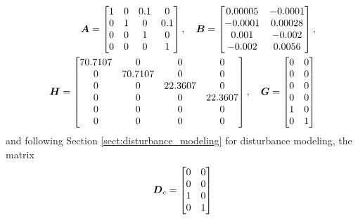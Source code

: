 \begin{equation*}
\begin{aligned}
    \vb*{A} = \begin{bmatrix}
        1 & 0 & 0.1 & 0\\
        0 & 1 & 0 & 0.1\\
        0 & 0 & 1 & 0\\
        0 & 0 & 0 & 1\\
    \end{bmatrix},\hspace{10pt}
    \vb*{B} = \begin{bmatrix}
	0.00005 & -0.0001\\
	-0.0001 & 0.00028\\
	0.001 & -0.002\\
	-0.002 & 0.0056\\
    \end{bmatrix},\\%
    \vb*{H} = \begin{bmatrix}
        70.7107 & 0 & 0 & 0\\
        0 & 70.7107 & 0 & 0\\
        0 & 0 & 22.3607 & 0\\
        0 & 0 & 0 & 22.3607\\
        0 & 0 & 0 & 0\\
        0 & 0 & 0 & 0\\
    \end{bmatrix},\hspace{10pt}
    \vb*{G} = \begin{bmatrix}
        0 & 0\\
        0 & 0\\
        0 & 0\\
        0 & 0\\
        1 & 0\\
        0 & 1\\
    \end{bmatrix}
\end{aligned}
\end{equation*}
and following Section \ref{sect:disturbance_modeling} for disturbance modeling, the matrix
\begin{equation*}
\begin{aligned}
    \vb*{D}_{c} = \begin{bmatrix}
        0 & 0\\
        0 & 0\\
        1 & 0\\
        0 & 1\\
    \end{bmatrix}
\end{aligned}
\end{equation*}
